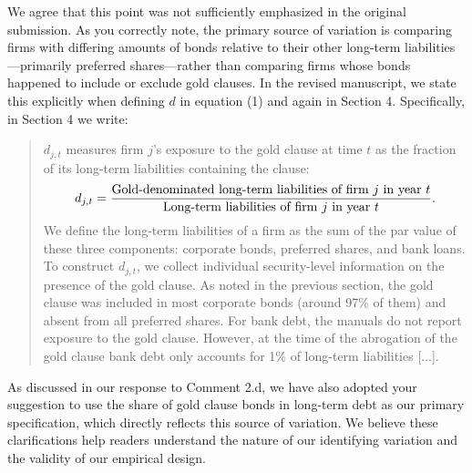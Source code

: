 \bigskip

\noindent We agree that this point was not sufficiently emphasized in the original submission. As you correctly note, the primary source of variation is comparing firms with differing amounts of bonds relative to their other long-term liabilities---primarily preferred shares---rather than comparing firms whose bonds happened to include or exclude gold clauses. In the revised manuscript, we state this explicitly when defining $d$ in equation (1) and again in Section 4. Specifically, in Section 4 we write:
\begin{quote}
$d_{j,t}$ measures firm $j$'s exposure to the gold clause at time $t$ as the fraction of its long-term liabilities containing the clause:
\begin{equation*}
d_{j,t} = \frac{\text{\normalsize{Gold-denominated long-term liabilities of firm $j$ in year $t$}}}{\text{\normalsize{Long-term liabilities of firm $j$ in year $t$}}}.
\end{equation*}
We define the long-term liabilities of a firm as the sum of the par value of these three components: corporate bonds, preferred shares, and bank loans. To construct $d_{j,t}$, we collect individual security-level information on the presence of the gold clause. As noted in the previous section, the gold clause was included in most corporate bonds (around 97\% of them) and absent from all preferred shares. For bank debt, the manuals do not report exposure to the gold clause. However, at the time of the abrogation of the gold clause bank debt only accounts for 1\% of long-term liabilities [...].
\end{quote}

As discussed in our response to Comment 2.d, we have also adopted your suggestion to use the share of gold clause bonds in long-term debt as our primary specification, which directly reflects this source of variation. We believe these clarifications help readers understand the nature of our identifying variation and the validity of our empirical design.
